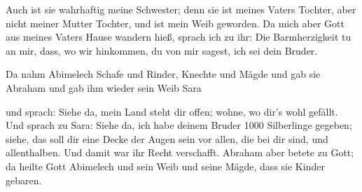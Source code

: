  Auch ist sie wahrhaftig meine Schwester; denn sie ist
meines Vaters Tochter, aber nicht meiner Mutter Tochter, und ist mein
Weib geworden.  Da mich aber Gott aus meines Vaters Hause
wandern hieß, sprach ich zu ihr: Die Barmherzigkeit tu an mir, dass, wo
wir hinkommen, du von mir sagest, ich sei dein Bruder.

 Da nahm Abimelech Schafe und Rinder, Knechte und Mägde und
gab sie Abraham und gab ihm wieder sein Weib Sara

 und sprach: Siehe da, mein Land steht dir offen; wohne, wo
dir's wohl gefällt.  Und sprach zu Sara: Siehe da, ich habe
deinem Bruder 1000 Silberlinge gegeben; siehe, das soll dir eine Decke
der Augen sein vor allen, die bei dir sind, und allenthalben. Und damit
war ihr Recht verschafft.  Abraham aber betete zu Gott; da
heilte Gott Abimelech und sein Weib und seine Mägde, dass sie Kinder
gebaren.

